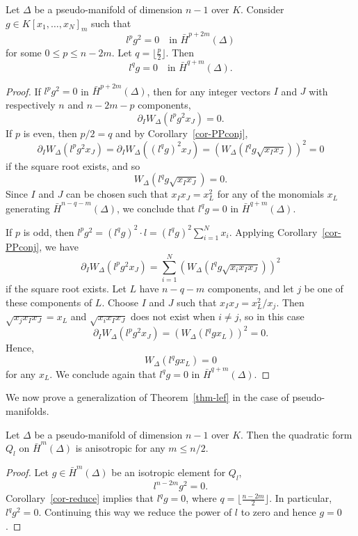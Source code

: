 \begin{coro} \label{cor-reduce}
Let $\Delta$ be a pseudo-manifold of dimension $n-1$ over $K$. Consider $g\in K[x_1,\ldots, x_N]_m$ such that 
\[ l^p g^2 = 0 \quad \text{in $\bar{H}^{p+2m}(\Delta)$}\]
for some  $0\leq p \leq n-2m$. 
Let $q = \lfloor \frac{p}{2}\rfloor$. Then
\[ l^q g = 0 \quad \text{in $\bar{H}^{q+m}(\Delta)$.}\]
\end{coro}

\begin{proof}
If $l^p g^2 = 0$ in $\bar{H}^{p+2m}(\Delta)$, then for any integer vectors $I$ and $J$ with respectively $n$ and $n-2m-p$ components,
\[ \partial_I W_\Delta(l^p g^2 x_J) = 0. \]
If $p$ is even, then $p/2 = q$ and by Corollary~\ref{cor-PPconj},
\[ \partial_I W_\Delta(l^p g^2 x_J) = \partial_I W_\Delta((l^q g)^2 x_J) = (W_\Delta( l^q g \sqrt{x_I x_J}))^2 = 0 \]
if the square root exists, and so
\[ W_\Delta( l^q g \sqrt{x_I x_J}) = 0. \]
Since $I$ and $J$ can be chosen such that $x_I x_J = x_L^2$  for any of the monomials $x_L$ generating $\bar{H}^{n-q-m}(\Delta)$,  we conclude that $l^q g = 0$ in $\bar{H}^{q+m}(\Delta)$.

If $p$ is odd, then $l^p g^2 = (l^q g)^2 \cdot l = (l^q g)^2 \sum_{i=1}^N x_i$. Applying Corollary~\ref{cor-PPconj}, we have
\[ \partial_I W_\Delta(l^p g^2 x_J) = \sum_{i=1}^N  (W_\Delta(l^q g \sqrt{ x_i x_I x_J} ))^2 \]
if the square root exists. Let $L$ have $n-q-m$ components, and let $j$ be one of these components of $L$. Choose $I$ and $J$ such that $x_I x_J = x_L^2/x_j$. Then $\sqrt{ x_j x_I x_J}  = x_L$ and $\sqrt{ x_i x_I x_J}$ does not exist when $i \neq j$, so in this case
\[ \partial_I W_\Delta(l^p g^2 x_J)
 =   (W_\Delta(l^q g x_L))^2 = 0. \]
Hence,
\[ W_\Delta(l^q g x_L) = 0 \]
for any $x_L$. We conclude again that $l^q g = 0$ in $\bar{H}^{q+m}(\Delta)$.
\end{proof}

We now prove a generalization of Theorem~\ref{thm-lef} in the case of pseudo-manifolds.

\begin{theorem}
Let $\Delta$ be a pseudo-manifold of dimension $n-1$ over $K$. Then the quadratic form $Q_l$ on $\bar{H}^m(\Delta)$ is anisotropic  for any $m\leq n/2$.
\end{theorem}

\begin{proof}
Let $g \in \bar{H}^m(\Delta)$ be an isotropic element for $Q_l$,
\[ l^{n-2m} g^2 = 0.\]
Corollary~\ref{cor-reduce} implies that $l^q g = 0$, where $q = \lfloor \frac{n-2m}{2}\rfloor$. In particular, $l^q g^2 = 0$. Continuing this way we reduce the power of $l$ to zero and hence $g=0$.
\end{proof}



